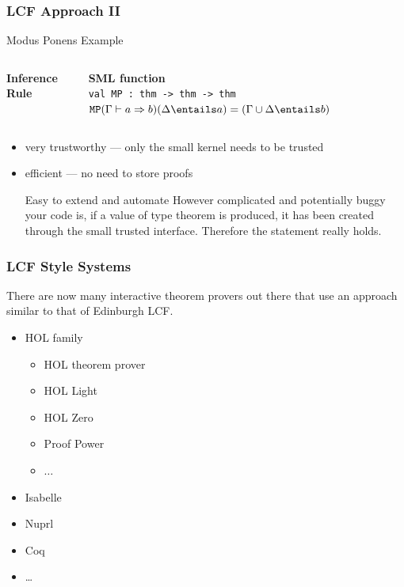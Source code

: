 \begin{frame}
\frametitle{LCF Approach II}

\begin{exampleblock}{Modus Ponens Example}
\begin{columns}
\begin{column}{.4\textwidth}
\textbf{Inference Rule}\\\medskip
{}
\end{column}
\begin{column}{.5\textwidth}
\textbf{SML function}\\\medskip
\texttt{val MP\ :\ thm -> thm -> thm}
$\texttt{MP} (\Gamma \vdash a \Rightarrow b) (\Delta \entails a) = (\Gamma \cup \Delta \entails b)$
\end{column}
\end{columns}
\end{exampleblock}

\begin{itemize}
\item very trustworthy --- only the small kernel needs to be trusted
\item efficient --- no need to store proofs
\begin{block}{Easy to extend and automate}
However complicated and potentially buggy your code is, if a value of type theorem is produced, it has been created through the small trusted interface. Therefore the statement really holds.
\end{block}
\end{itemize}
\end{frame}

\begin{frame}
\frametitle{LCF Style Systems}

There are now many interactive theorem provers out there that use
an approach similar to that of Edinburgh LCF.
\begin{itemize}
\item HOL family
\begin{itemize}
  \item HOL theorem prover
  \item HOL Light
  \item HOL Zero
  \item Proof Power
  \item $\ldots$
\end{itemize}
\item Isabelle
\item Nuprl
\item Coq
\item \ldots
\end{itemize}
\end{frame}


